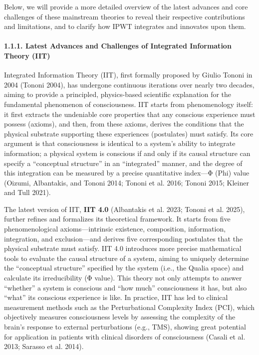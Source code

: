 \documentclass[
  a4paper]{article}
\begin{document}
Below, we will provide a more detailed overview of the latest advances
and core challenges of these mainstream theories to reveal their
respective contributions and limitations, and to clarify how IPWT
integrates and innovates upon them.

\paragraph{1.1.1. Latest Advances and Challenges of Integrated
Information Theory
(IIT)}\label{latest-advances-and-challenges-of-integrated-information-theory-iit}

Integrated Information Theory (IIT), first formally proposed by Giulio
Tononi in 2004 (Tononi 2004), has undergone continuous iterations over
nearly two decades, aiming to provide a principled, physics-based
scientific explanation for the fundamental phenomenon of consciousness.
IIT starts from phenomenology itself: it first extracts the undeniable
core properties that any conscious experience must possess (axioms), and
then, from these axioms, derives the conditions that the physical
substrate supporting these experiences (postulates) must satisfy. Its
core argument is that consciousness is identical to a system's ability
to integrate information; a physical system is conscious if and only if
its causal structure can specify a ``conceptual structure'' in an
``integrated'' manner, and the degree of this integration can be
measured by a precise quantitative index---Φ (Phi) value (Oizumi,
Albantakis, and Tononi 2014; Tononi et al. 2016; Tononi 2015; Kleiner
and Tull 2021).

The latest version of IIT, \textbf{IIT 4.0} (Albantakis et al. 2023;
Tononi et al. 2025), further refines and formalizes its theoretical
framework. It starts from five phenomenological axioms---intrinsic
existence, composition, information, integration, and exclusion---and
derives five corresponding postulates that the physical substrate must
satisfy. IIT 4.0 introduces more precise mathematical tools to evaluate
the causal structure of a system, aiming to uniquely determine the
``conceptual structure'' specified by the system (i.e., the Qualia
space) and calculate its irreducibility (Φ value). This theory not only
attempts to answer ``whether'' a system is conscious and ``how much''
consciousness it has, but also ``what'' its conscious experience is
like. In practice, IIT has led to clinical measurement methods such as
the Perturbational Complexity Index (PCI), which objectively measures
consciousness levels by assessing the complexity of the brain's response
to external perturbations (e.g., TMS), showing great potential for
application in patients with clinical disorders of consciousness (Casali
et al. 2013; Sarasso et al. 2014).
\end{document}
